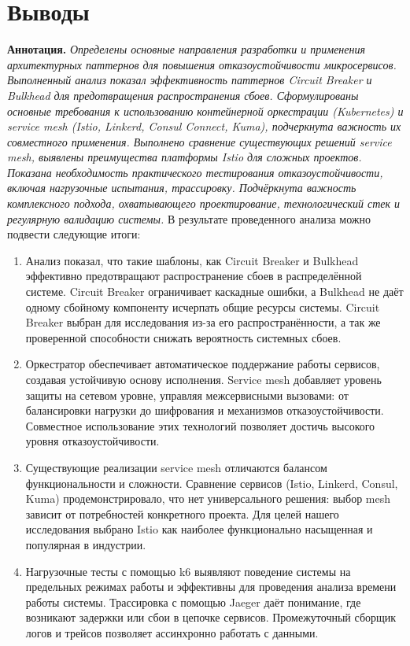 \section{Выводы}
\textbf{Аннотация.} \textit{Определены основные направления разработки и применения архитектурных паттернов для повышения отказоустойчивости микросервисов. Выполненный анализ показал эффективность паттернов Circuit Breaker и Bulkhead для предотвращения распространения сбоев. Сформулированы основные требования к использованию контейнерной оркестрации (Kubernetes) и service mesh (Istio, Linkerd, Consul Connect, Kuma), подчеркнута важность их совместного применения. Выполнено сравнение существующих решений service mesh, выявлены преимущества платформы Istio для сложных проектов. Показана необходимость практического тестирования отказоустойчивости, включая нагрузочные испытания, трассировку. Подчёркнута важность комплексного подхода, охватывающего проектирование, технологический стек и регулярную валидацию системы.}
В результате проведенного анализа можно подвести следующие итоги:
\begin{enumerate}
    \item Анализ показал, что такие шаблоны, как Circuit Breaker и Bulkhead эффективно предотвращают распространение сбоев в распределённой системе. Circuit Breaker ограничивает каскадные ошибки, а Bulkhead не даёт одному сбойному компоненту исчерпать общие ресурсы системы. Circuit Breaker выбран для исследования из-за его распространённости, а так же проверенной способности снижать вероятность системных сбоев.

    \item Оркестратор обеспечивает автоматическое поддержание работы сервисов, создавая устойчивую основу исполнения. Service mesh добавляет уровень защиты на сетевом уровне, управляя межсервисными вызовами: от балансировки нагрузки до шифрования и механизмов отказоустойчивости. Совместное использование этих технологий позволяет достичь высокого уровня отказоустойчивости.

    \item Существующие реализации service mesh отличаются балансом функциональности и сложности. Сравнение сервисов (Istio, Linkerd, Consul, Kuma) продемонстрировало, что нет универсального решения: выбор mesh зависит от потребностей конкретного проекта. Для целей нашего исследования выбрано Istio как наиболее функционально насыщенная и популярная в индустрии.

    \item Нагрузочные тесты с помощью k6 выявляют поведение системы на предельных режимах работы и эффективны для проведения анализа времени работы системы. Трассировка с помощью Jaeger даёт понимание, где возникают задержки или сбои в цепочке сервисов. Промежуточный сборщик логов и трейсов позволяет ассинхронно работать с данными.

\end{enumerate}
